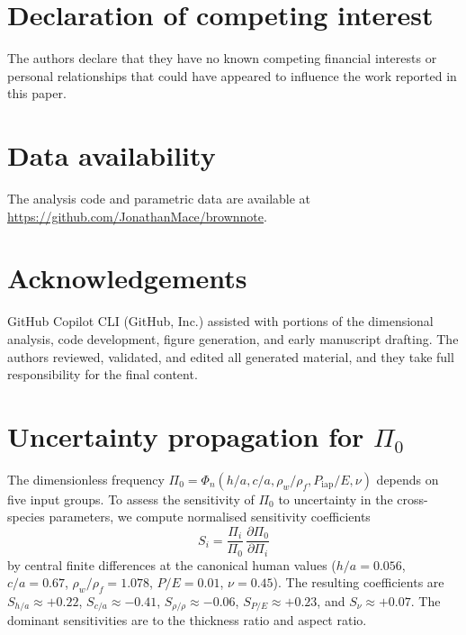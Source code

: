 \documentclass[review]{elsarticle}
\begin{document}
\section*{Declaration of competing interest}
The authors declare that they have no known competing financial interests
or personal relationships that could have appeared to influence the work
reported in this paper.

\section*{Data availability}
The analysis code and parametric data are available at
\url{https://github.com/JonathanMace/brownnote}.

\section*{Acknowledgements}
GitHub Copilot CLI (GitHub, Inc.) assisted with portions of the dimensional
analysis, code development, figure generation, and early manuscript drafting.
The authors reviewed, validated, and edited all generated material, and they
take full responsibility for the final content.




\appendix

\section{Uncertainty propagation for $\Pi_0$}
\label{app:uncertainty}

The dimensionless frequency $\Pi_0 = \Phi_n(h/a, c/a, \rho_w/\rho_f,
P_\mathrm{iap}/E, \nu)$ depends on five input groups.  To assess the
sensitivity of $\Pi_0$ to uncertainty in the cross-species parameters, we
compute normalised sensitivity coefficients
\begin{equation}
  S_i = \frac{\Pi_i}{\Pi_0}\,\frac{\partial \Pi_0}{\partial \Pi_i}
\end{equation}
by central finite differences at the canonical human values ($h/a = 0.056$,
$c/a = 0.67$, $\rho_w/\rho_f = 1.078$, $P/E = 0.01$, $\nu = 0.45$).
The resulting coefficients are $S_{h/a} \approx +0.22$,
$S_{c/a} \approx -0.41$, $S_{\rho/\rho} \approx -0.06$,
$S_{P/E} \approx +0.23$, and $S_\nu \approx +0.07$.  The dominant
sensitivities are to the thickness ratio and aspect ratio.
\end{document}

